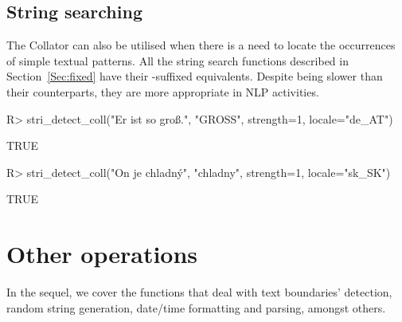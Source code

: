 \documentclass[nojss]{jss}
\begin{document}







\subsection{String searching}

The  Collator can also be utilised
when there is a need to locate the occurrences of simple textual patterns.
All the string search functions described in Section~\ref{Sec:fixed}
have their -suffixed equivalents.
Despite being slower than their  counterparts,
they are more appropriate in NLP activities.

\begin{Schunk}
\begin{Sinput}
R> stri_detect_coll("Er ist so groß.", "GROSS", strength=1, locale="de_AT")
\end{Sinput}
\begin{Soutput}
[1] TRUE
\end{Soutput}
\begin{Sinput}
R> stri_detect_coll("On je chladný", "chladny", strength=1, locale="sk_SK")
\end{Sinput}
\begin{Soutput}
[1] TRUE
\end{Soutput}
\end{Schunk}





\section{Other operations}\label{Sec:other}

In the sequel, we cover the functions that deal with
text boundaries' detection, random string generation,
date/time formatting and parsing, amongst others.
\end{document}
